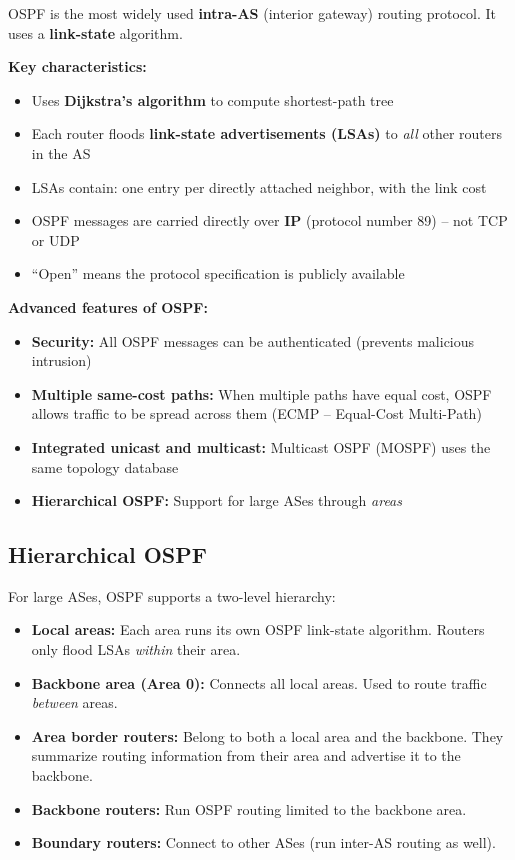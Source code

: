 \begin{keybox}
OSPF is the most widely used \textbf{intra-AS} (interior gateway) routing protocol. It uses a \textbf{link-state} algorithm.

\textbf{Key characteristics:}
\begin{itemize}[noitemsep]
    \item Uses \textbf{Dijkstra's algorithm} to compute shortest-path tree
    \item Each router floods \textbf{link-state advertisements (LSAs)} to \emph{all} other routers in the AS
    \item LSAs contain: one entry per directly attached neighbor, with the link cost
    \item OSPF messages are carried directly over \textbf{IP} (protocol number 89) -- not TCP or UDP
    \item ``Open'' means the protocol specification is publicly available
\end{itemize}

\textbf{Advanced features of OSPF:}
\begin{itemize}[noitemsep]
    \item \textbf{Security:} All OSPF messages can be authenticated (prevents malicious intrusion)
    \item \textbf{Multiple same-cost paths:} When multiple paths have equal cost, OSPF allows traffic to be spread across them (ECMP -- Equal-Cost Multi-Path)
    \item \textbf{Integrated unicast and multicast:} Multicast OSPF (MOSPF) uses the same topology database
    \item \textbf{Hierarchical OSPF:} Support for large ASes through \emph{areas}
\end{itemize}
\end{keybox}

\subsection{Hierarchical OSPF}

\begin{keybox}
For large ASes, OSPF supports a two-level hierarchy:
\begin{itemize}[noitemsep]
    \item \textbf{Local areas:} Each area runs its own OSPF link-state algorithm. Routers only flood LSAs \emph{within} their area.
    \item \textbf{Backbone area (Area 0):} Connects all local areas. Used to route traffic \emph{between} areas.
    \item \textbf{Area border routers:} Belong to both a local area and the backbone. They summarize routing information from their area and advertise it to the backbone.
    \item \textbf{Backbone routers:} Run OSPF routing limited to the backbone area.
    \item \textbf{Boundary routers:} Connect to other ASes (run inter-AS routing as well).
\end{itemize}
\end{keybox}

